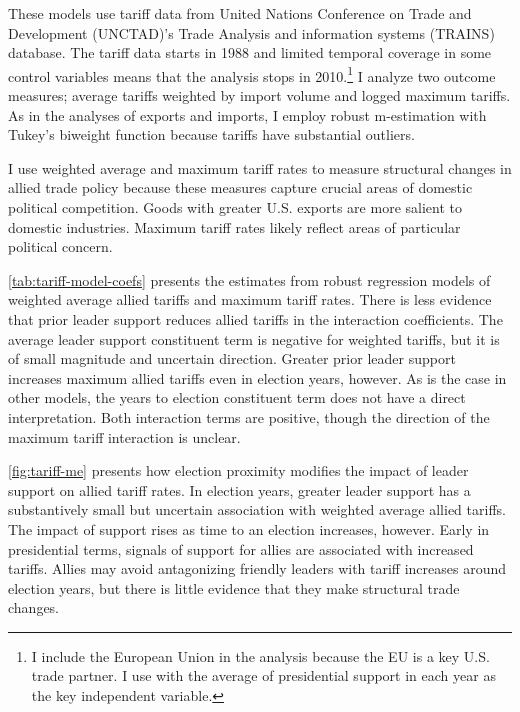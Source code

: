 \documentclass[12pt]{article}
\begin{document}
These models use tariff data from United Nations Conference on Trade and Development (UNCTAD)'s Trade Analysis and information systems (TRAINS) database. 
The tariff data starts in 1988 and limited temporal coverage in some control variables means that the analysis stops in 2010.\footnote{I include the European Union in the analysis because the EU is a key U.S. trade partner. I use with the average of presidential support in each year as the key independent variable.}
I analyze two outcome measures; average tariffs weighted by import volume and logged maximum tariffs. 
As in the analyses of exports and imports, I employ robust m-estimation with Tukey's biweight function because tariffs have substantial outliers.


I use weighted average and maximum tariff rates to measure structural changes in allied trade policy because these measures capture crucial areas of domestic political competition.
Goods with greater U.S. exports are more salient to domestic industries. 
Maximum tariff rates likely reflect areas of particular political concern.


\autoref{tab:tariff-model-coefs} presents the estimates from robust regression models of weighted average allied tariffs and maximum tariff rates. 
There is less evidence that prior leader support reduces allied tariffs in the interaction coefficients. 
The average leader support constituent term is negative for weighted tariffs, but it is of small magnitude and uncertain direction.
Greater prior leader support increases maximum allied tariffs even in election years, however.
As is the case in other models, the years to election constituent term does not have a direct interpretation.
Both interaction terms are positive, though the direction of the maximum tariff interaction is unclear. 




\autoref{fig:tariff-me} presents how election proximity modifies the impact of leader support on allied tariff rates.
In election years, greater leader support has a substantively small but uncertain association with weighted average allied tariffs. 
The impact of support rises as time to an election increases, however. 
Early in presidential terms, signals of support for allies are associated with increased tariffs. 
Allies may avoid antagonizing friendly leaders with tariff increases around election years, but there is little evidence that they make structural trade changes.
\end{document}
